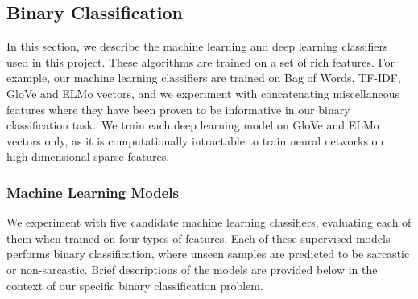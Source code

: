 \documentclass[12pt,a4paper]{article}
\begin{document}
\subsection{Binary Classification}\vspace{-5pt}
\noindent In this section, we describe the machine learning and deep learning classifiers used in this project. These algorithms are trained on a set of rich features. For example, our machine learning classifiers are trained on Bag of Words, TF-IDF, GloVe and ELMo vectors, and we experiment with concatenating miscellaneous features where they have been proven to be informative in our binary classification task.\ We train each deep learning model on GloVe and ELMo vectors only, as it is computationally intractable to train neural networks on high-dimensional sparse features.\vspace{-5pt}

\subsubsection{Machine Learning Models}
We experiment with five candidate machine learning classifiers, evaluating each of them when trained on four types of features. Each of these supervised models performs binary classification, where unseen samples are predicted to be sarcastic or non-sarcastic. Brief descriptions of the models are provided below in the context of our specific binary classification problem. \vspace{-3pt}
\end{document}
